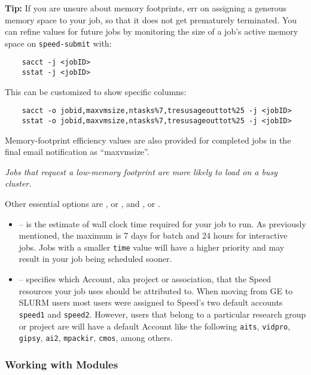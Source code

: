 \noindent \textbf{Tip:} If you are unsure about memory footprints, err on assigning a generous
memory space to your job, so that it does not get prematurely terminated.
You can refine  values for future jobs by monitoring the size of a job's active
memory space on \texttt{speed-submit} with:

\begin{verbatim}
    sacct -j <jobID>
    sstat -j <jobID>
\end{verbatim}

\noindent This can be customized to show specific columns:

\begin{verbatim}
    sacct -o jobid,maxvmsize,ntasks%7,tresusageouttot%25 -j <jobID>
    sstat -o jobid,maxvmsize,ntasks%7,tresusageouttot%25 -j <jobID>
\end{verbatim}

\noindent Memory-footprint efficiency values  are also provided for completed jobs
in the final email notification as ``maxvmsize''.

\emph{Jobs that request a low-memory footprint are more likely to load on a busy cluster.}

\noindent Other essential options are , or , and , or .
\begin{itemize}
    \item {} -- is the estimate of wall clock time required for your job to run.
    As previously mentioned, the maximum is 7 days for batch and 24 hours for interactive jobs.
    Jobs with a smaller \texttt{time} value will have a higher priority and may result in your job being scheduled sooner.
    \item {} -- specifies which Account, aka project or association,
    that the Speed resources your job uses should be attributed to. When moving from
    GE to SLURM users most users were assigned to Speed's two default accounts
    \texttt{speed1} and \texttt{speed2}. However, users that belong to a particular research
    group or project are will have a default Account like the following
    \texttt{aits},
    \texttt{vidpro},
    \texttt{gipsy},
    \texttt{ai2},
    \texttt{mpackir},
    \texttt{cmos}, among others.
\end{itemize}

\subsubsection{Working with Modules}
\label{sect:modules}

